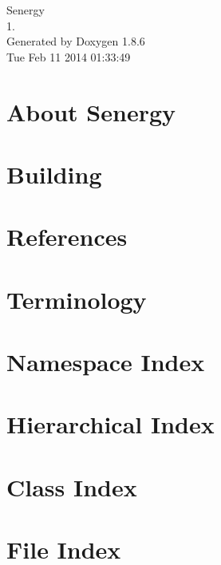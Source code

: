 \documentclass[twoside]{book}
\newcommand{\clearemptydoublepage}{%
  \newpage{\pagestyle{empty}\cleardoublepage}%
}
\begin{document}
\hypersetup{pageanchor=false}
\begin{titlepage}
\vspace*{7cm}
\begin{center}%
{\Large Senergy \\[1ex]\large 1. }\\
\vspace*{1cm}
{\large Generated by Doxygen 1.8.6}\\
\vspace*{0.5cm}
{\small Tue Feb 11 2014 01:33:49}\\
\end{center}
\end{titlepage}
\clearemptydoublepage
\tableofcontents
\clearemptydoublepage
{}
\hypersetup{pageanchor=true}

\chapter{About Senergy}
\label{index}\hypertarget{index}{}
\chapter{Building}
\label{building}
\hypertarget{building}{}

\chapter{References}
\label{references}
\hypertarget{references}{}

\chapter{Terminology}
\label{terminology}
\hypertarget{terminology}{}

\chapter{Namespace Index}

\chapter{Hierarchical Index}

\chapter{Class Index}

\chapter{File Index}

\end{document}
